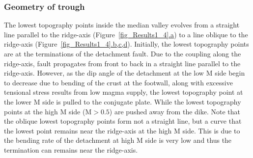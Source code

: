\subsubsection{Geometry of trough}

The lowest topography points inside the median valley evolves from a straight line parallel to the ridge-axis (Figure~\hyperref[fig_Results1_4]{\ref{fig_Results1_4}.a}) to a line oblique to the ridge-axis (Figure~\hyperref[fig_Results1_4]{\ref{fig_Results1_4}.b,c,d}). Initially, the lowest topography points are at the terminations of the detachment fault. Due to the coupling along the ridge-axis, fault propagates from front to back in a straight line parallel to the ridge-axis. However, as the dip angle of the detachment at the low M side begin to decrease due to bending of the crust at the footwall, along with excessive tensional stress results from low magma supply, the lowest topography point at the lower M side is pulled to the conjugate plate. While the lowest topography points at the high M side (M$>0.5$) are pushed away from the dike. Note that the oblique lowest topography points form not a straight line, but a curve that the lowest point remains near the ridge-axis at the high M side. This is due to the bending rate of the detachment at high M side is very low and thus the termination can remains near the ridge-axis.      


